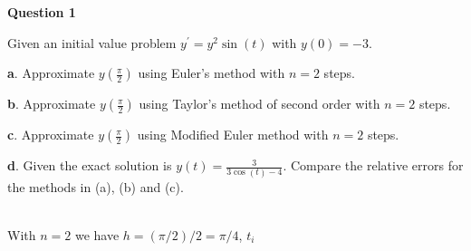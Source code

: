 

\begin{tcolorbox}
\textbf{Question 1} 

Given an initial value problem $y^{\prime}=y^{2} \sin (t)$ with $y(0)=-3$.


\textbf a. Approximate $y\left(\frac{\pi}{2}\right)$ using Euler's method with $n=2$ steps.



\textbf b. Approximate $y\left(\frac{\pi}{2}\right)$ using Taylor's method of second order with $n=2$ steps.



\textbf c. Approximate $y\left(\frac{\pi}{2}\right)$ using Modified Euler method with $n=2$ steps.



\textbf d. Given the exact solution is $y(t)=\frac{3}{3 \cos (t)-4}$. Compare the relative errors for the methods in (a), (b) and (c).






\end{tcolorbox}

\begin{solution}\ \\


With $n=2$ we have $h=(\pi/2)/2=\pi/4$, $t_i$









\end{solution}


